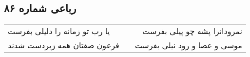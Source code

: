 \begin{center}
\section*{رباعی شماره ۸۶}
\label{sec:sh086}
\begin{longtable}{l p{0.5cm} r}
یا رب تو زمانه را دلیلی بفرست
&&
نمرودانرا پشه چو پیلی بفرست
\\
فرعون صفتان همه زبردست شدند
&&
موسی و عصا و رود نیلی بفرست
\\
\end{longtable}
\end{center}

